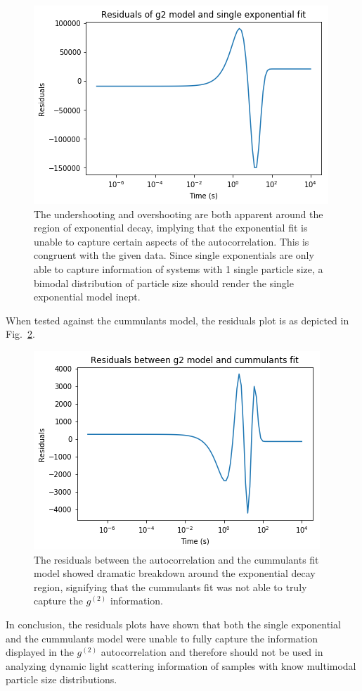 \documentclass[11pt]{article}
\begin{document}
\begin{figure}
\centering
\includegraphics[width=0.5\linewidth]{expo_residuals.png}
\caption{The undershooting and overshooting are both apparent around the region of exponential decay, implying that the exponential fit is unable to capture certain aspects of the autocorrelation. This is congruent with the given data. Since single exponentials are only able to capture information of systems with 1 single particle size, a bimodal distribution of particle size should render the single exponential model inept.}
\label{fig:expo_residuals}
\end{figure}

When tested against the cummulants model, the residuals plot is as depicted in Fig.~\ref{fig:cummulants_residuals}.

\begin{figure}
\centering
\includegraphics[width=0.5\linewidth]{cummulants_fit_residuals.png}
\caption{The residuals between the autocorrelation and the cummulants fit model showed dramatic breakdown around the exponential decay region, signifying that the cummulants fit was not able to truly capture the $g^{(2)}$ information.}
\label{fig:cummulants_residuals}
\end{figure}

In conclusion, the residuals plots have shown that both the single exponential and the cummulants model were unable to fully capture the information displayed in the $g^{(2)}$ autocorrelation and therefore should not be used in analyzing dynamic light scattering information of samples with know multimodal particle size distributions. 
\end{document}
